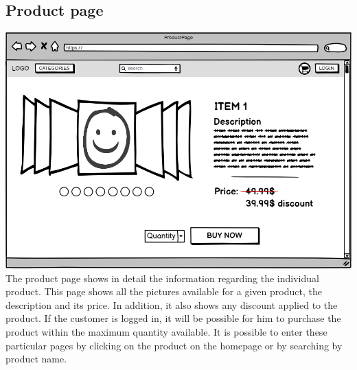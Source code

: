 \subsection{Product page}
    \includegraphics[width=\textwidth,height=\textheight,keepaspectratio]{mockups/productPageMockup.png}
\\
The product page shows in detail the information regarding the individual product.
This page shows all the pictures available for a given product, the description and its price.
In addition, it also shows any discount applied to the product.
If the customer is logged in, it will be possible for him to purchase the product within the maximum quantity available. It is possible to enter these particular pages by clicking on the product on the homepage or by searching by product name.

